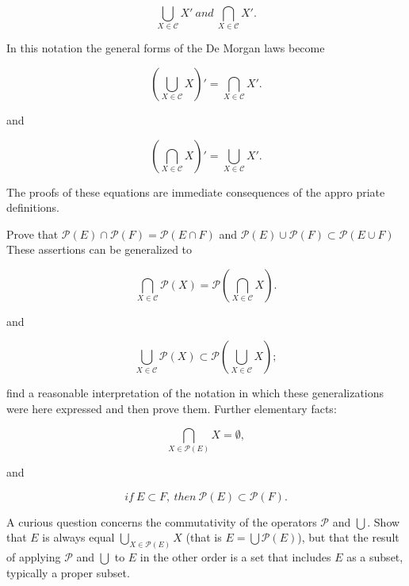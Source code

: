 \begin{equation*}
\bigcup_{X \in \mathcal{C}} X' \: and \: \bigcap_{X \in \mathcal{C}} X' .
\end{equation*}

In this notation the general forms of the De Morgan laws become 

\begin{equation*}
( \bigcup_{X \in \mathcal{C}} X)' = \bigcap_{X \in \mathcal{C}} X' .
\end{equation*}

and 

\begin{equation*}
( \bigcap_{X \in \mathcal{C}} X)' = \bigcup_{X \in \mathcal{C}} X' .
\end{equation*}

The proofs of these equations are immediate consequences of the appro priate definitions. 

\begin{exercise} Prove that $ \mathcal{P} (E) \cap \mathcal{P} (F) = \mathcal{P}(E \cap F) $ and $ \mathcal{P} (E) \cup \mathcal{P} (F) \subset \mathcal{P}(E \cup F) $ These assertions can be generalized to 

\begin{equation*}
\bigcap_{X \in \mathcal{C}} \mathcal{P} (X) = \mathcal{P} ( \bigcap_{X \in \mathcal{C}} X) .
\end{equation*}

and

\begin{equation*}
\bigcup_{X \in \mathcal{C}} \mathcal{P} (X) \subset \mathcal{P} ( \bigcup_{X \in \mathcal{C}} X) ;
\end{equation*}

find a reasonable interpretation of the notation in which these generalizations were here expressed and then prove them. Further  elementary facts: 

\begin{equation*}
\bigcap_{X \in \mathcal{P} (E)} X = \emptyset ,
\end{equation*}

and 

\begin{equation*}
if \: E \subset F , \: then \: \mathcal{P} (E) \subset \mathcal{P} (F).
\end{equation*}

A curious question concerns the commutativity of the operators $ \mathcal{P} $ and $ \bigcup $. Show that $E$ is always equal $\bigcup_{X \in \mathcal{P} (E)} X $ (that is $ E = \bigcup \mathcal{P} (E) $), but that the result of applying $\mathcal{P} $ and $ \bigcup $ to $E$ in the other order is a set that includes $E$ as a subset, typically a proper subset.
\end{exercise}